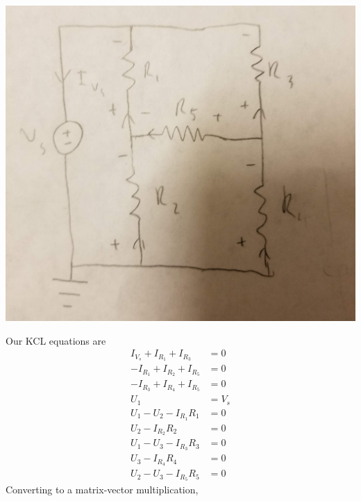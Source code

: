 \documentclass[]{article}
\begin{document}
\begin{center}
	\includegraphics[width=0.7\linewidth]{20191018_214629}
\end{center}
Our KCL equations are 
\begin{align}
	I_{V_s} + I_{R_1} + I_{R_3} &= 0 \\
	-I_{R_1} + I_{R_2} + I_{R_5} &= 0 \\
	-I_{R_3} + I_{R_4} + I_{R_5} &= 0 \\
	U_1 &= V_s \\
	U_1 - U_2 - I_{R_1} R_1 &= 0 \\
	U_2 - I_{R_2} R_2 &= 0 \\
	U_1 - U_3 - I_{R_3} R_3 &= 0 \\
	U_3 - I_{R_4} R_4 &= 0 \\
	U_2 - U_3 - I_{R_5} R_5 &= 0
\end{align}
Converting to a matrix-vector multiplication, 
\end{document}

